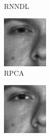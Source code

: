 \begin{figure}
\begin{subfigure}[b]{.19\linewidth}
    \caption{RNNDL}
\end{subfigure}\hfill
\begin{subfigure}[b]{.19\linewidth}
    \includegraphics[width = \linewidth]{DN_yale/yale_03_1_rpca_fsim} 
    \caption{RPCA}
\end{subfigure}\hfill
\begin{subfigure}[b]{.19\linewidth}
    \includegraphics[width = \linewidth]{DN_yale/yale_03_1_rpca2d_l1_fsim}

\end{subfigure}
\end{figure}
